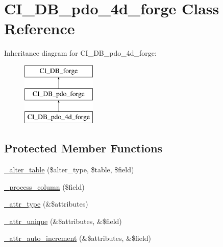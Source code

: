 \hypertarget{class_c_i___d_b__pdo__4d__forge}{}\section{C\+I\+\_\+\+D\+B\+\_\+pdo\+\_\+4d\+\_\+forge Class Reference}
\label{class_c_i___d_b__pdo__4d__forge}
Inheritance diagram for C\+I\+\_\+\+D\+B\+\_\+pdo\+\_\+4d\+\_\+forge\+:\begin{figure}[H]
\begin{center}
\leavevmode
\includegraphics[height=3.000000cm]{class_c_i___d_b__pdo__4d__forge}
\end{center}
\end{figure}
\subsection*{Protected Member Functions}
\begin{DoxyCompactItemize}
\item 
\hyperlink{class_c_i___d_b__pdo__4d__forge_a41c6cae02f2fda8b429ad0afb9509426}{\+\_\+alter\+\_\+table} (\$alter\+\_\+type, \$table, \$field)
\item 
\hyperlink{class_c_i___d_b__pdo__4d__forge_a8f38f1c5b5dddecca4befbe393f3f299}{\+\_\+process\+\_\+column} (\$field)
\item 
\hyperlink{class_c_i___d_b__pdo__4d__forge_a8553be952084c6f7cdfff370a1d14f6b}{\+\_\+attr\+\_\+type} (\&\$attributes)
\item 
\hyperlink{class_c_i___d_b__pdo__4d__forge_a7568a93ea53a7392a63fffe83bb7a090}{\+\_\+attr\+\_\+unique} (\&\$attributes, \&\$field)
\item 
\hyperlink{class_c_i___d_b__pdo__4d__forge_a2a013a5932439c3c44f0dad3436525f7}{\+\_\+attr\+\_\+auto\+\_\+increment} (\&\$attributes, \&\$field)
\end{DoxyCompactItemize}
